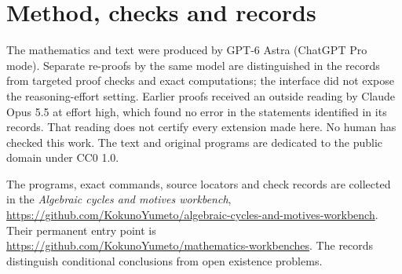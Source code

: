 \documentclass[11pt]{article}
\theoremstyle{definition}
\theoremstyle{remark}
\newcommand{\workbenchurl}{https://github.com/KokunoYumeto/algebraic-cycles-and-motives-workbench}
\newcommand{\recordurl}{https://github.com/KokunoYumeto/mathematics-workbenches}
\begin{document}
\section*{Method, checks and records}
The mathematics and text were produced by GPT-6 Astra (ChatGPT Pro
mode). Separate re-proofs by the same model are distinguished in the
records from targeted proof checks and exact computations; the interface
did not expose the reasoning-effort setting. Earlier proofs received
an outside reading by Claude Opus 5.5 at effort high, which found no
error in the statements identified in its records. That reading does
not certify every extension made here. No human has checked this work.
The text and original programs are dedicated to the public domain
under CC0 1.0.

The programs, exact commands, source locators and check records are
collected in the \emph{Algebraic cycles and motives workbench},
\url{\workbenchurl}. Their permanent entry point is
\url{\recordurl}. The records distinguish conditional conclusions
from open existence problems.
\end{document}
